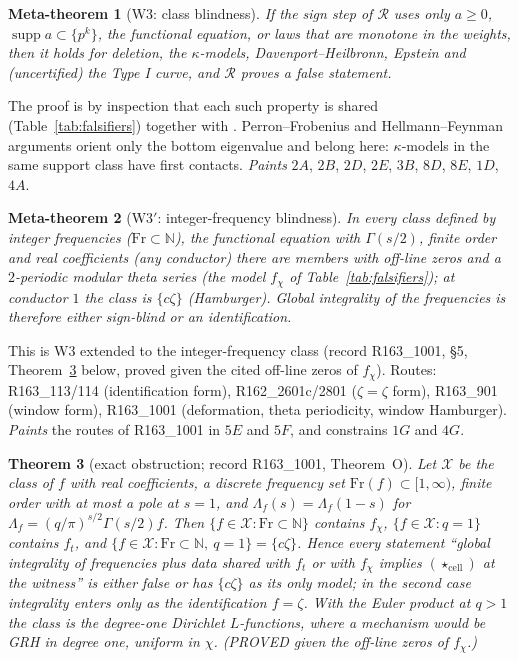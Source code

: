 \documentclass[11pt]{amsart}
\newtheorem{theorem}{Theorem}[section]
\newtheorem{metatheorem}[theorem]{Meta-theorem}
\theoremstyle{definition}
\theoremstyle{remark}
\newcommand{\N}{\mathbb N}
\newcommand{\supp}{\operatorname{supp}}
\begin{document}
\begin{metatheorem}[W3: class blindness]\label{W3}
If the sign step of $\mathcal R$ uses only $a\ge0$, $\supp a\subset\{p^k\}$, the functional equation, or laws
that are monotone in the weights, then it holds for deletion, the $\kappa$-models, Davenport--Heilbronn,
Epstein and (uncertified) the Type I curve, and $\mathcal R$ proves a false statement.
\end{metatheorem}
\noindent The proof is by inspection that each such property is shared (Table~\ref{tab:falsifiers}) together with
\cite[Thm.~12.5]{Paper47}. Perron--Frobenius and Hellmann--Feynman arguments orient only the
bottom eigenvalue and belong here: $\kappa$-models in the same support class have first contacts.
\emph{Paints} $2A$, $2B$, $2D$, $2E$, $3B$, $8D$, $8E$, $1D$, $4A$.

\begin{metatheorem}[W3$'$: integer-frequency blindness]\label{W3prime}
In every class defined by integer frequencies ($\mathrm{Fr}\subset\N$), the functional equation with $\Gamma(s/2)$,
finite order and real coefficients (any conductor) there are members with off-line zeros and a $2$-periodic
modular theta series (the model $f_\chi$ of Table~\ref{tab:falsifiers}); at conductor $1$ the class is $\{c\zeta\}$
(Hamburger). Global integrality of the frequencies is therefore either sign-blind or an identification.
\end{metatheorem}
\noindent This is W3 extended to the integer-frequency class (record R163\_1001, \S5, Theorem~\ref{thm:O} below,
proved given the cited off-line zeros of $f_\chi$). Routes: R163\_113/114 (identification form), R162\_2601c/2801
($\zeta=\zeta$ form), R163\_901 (window form), R163\_1001 (deformation, theta periodicity, window Hamburger).
\emph{Paints} the routes of R163\_1001 in $5E$ and $5F$, and constrains $1G$ and $4G$.

\begin{theorem}[exact obstruction; record R163\_1001, Theorem~O]\label{thm:O}
Let $\mathcal X$ be the class of $f$ with real coefficients, a discrete frequency set $\mathrm{Fr}(f)\subset[1,\infty)$,
finite order with at most a pole at $s=1$, and $\Lambda_f(s)=\Lambda_f(1-s)$ for $\Lambda_f=(q/\pi)^{s/2}\Gamma(s/2)f$.
Then $\{f\in\mathcal X:\mathrm{Fr}\subset\N\}$ contains $f_\chi$, $\{f\in\mathcal X:q=1\}$ contains $f_t$, and
$\{f\in\mathcal X:\mathrm{Fr}\subset\N,\ q=1\}=\{c\zeta\}$. Hence every statement ``global integrality of frequencies
plus data shared with $f_t$ or with $f_\chi$ implies $(\star_{\mathrm{cell}})$ at the witness'' is either false or has
$\{c\zeta\}$ as its only model; in the second case integrality enters only as the identification $f=\zeta$. With the
Euler product at $q>1$ the class is the degree-one Dirichlet $L$-functions, where a mechanism would be GRH in degree
one, uniform in $\chi$. (PROVED given the off-line zeros of $f_\chi$.)
\end{theorem}
\end{document}
